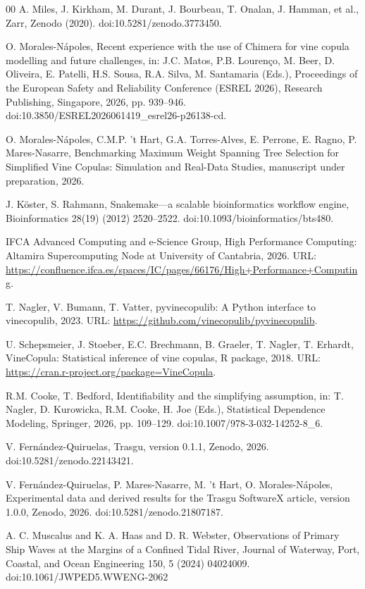 \documentclass[preprint,12pt, a4paper]{elsarticle}
\begin{document}
\begin{thebibliography}{00}
A. Miles, J. Kirkham, M. Durant, J. Bourbeau, T. Onalan, J. Hamman, et al.,
Zarr, Zenodo (2020). doi:10.5281/zenodo.3773450.

O. Morales-N{\'a}poles, Recent experience with the use of Chimera for vine
copula modelling and future challenges, in: J.C. Matos, P.B. Louren{\c{c}}o,
M. Beer, D. Oliveira, E. Patelli, H.S. Sousa, R.A. Silva, M. Santamaria
(Eds.), Proceedings of the European Safety and Reliability Conference
(ESREL 2026), Research Publishing, Singapore, 2026, pp. 939--946.
doi:10.3850/ESREL2026061419\_esrel26-p26138-cd.

O. Morales-N{\'a}poles, C.M.P. {'t} Hart, G.A. Torres-Alves, E. Perrone,
E. Ragno, P. Mares-Nasarre, Benchmarking Maximum Weight Spanning Tree Selection for Simplified Vine Copulas: Simulation and Real-Data Studies, manuscript under preparation, 2026.

J. K{\"o}ster, S. Rahmann, Snakemake---a scalable bioinformatics workflow
engine, Bioinformatics 28(19) (2012) 2520--2522.
doi:10.1093/bioinformatics/bts480.

IFCA Advanced Computing and e-Science Group, High Performance Computing:
Altamira Supercomputing Node at University of Cantabria, 2026.
URL: \url{https://confluence.ifca.es/spaces/IC/pages/66176/High+Performance+Computing}.

T. Nagler, V. Bumann, T. Vatter, pyvinecopulib: A Python interface to
vinecopulib, 2023. URL: \url{https://github.com/vinecopulib/pyvinecopulib}.

U. Schepsmeier, J. Stoeber, E.C. Brechmann, B. Graeler, T. Nagler,
T. Erhardt, VineCopula: Statistical inference of vine copulas, R package,
2018. URL: \url{https://cran.r-project.org/package=VineCopula}.

R.M. Cooke, T. Bedford, Identifiability and the simplifying assumption,
in: T. Nagler, D. Kurowicka, R.M. Cooke, H. Joe (Eds.),
Statistical Dependence Modeling, Springer, 2026, pp. 109--129.
doi:10.1007/978-3-032-14252-8\_6.

V. Fern\'andez-Quiruelas, Trasgu, version 0.1.1, Zenodo, 2026.
doi:10.5281/zenodo.22143421.

V. Fern\'andez-Quiruelas, P. Mares-Nasarre, M. {'t} Hart,
O. Morales-N\'apoles, Experimental data and derived results for the Trasgu
SoftwareX article, version 1.0.0, Zenodo, 2026.
doi:10.5281/zenodo.21807187.

A. C. Muscalus  and K. A. Haas  and D. R. Webster, Observations of Primary Ship Waves at the Margins of a Confined Tidal River, Journal of Waterway, Port, Coastal, and Ocean Engineering 150, 5 (2024) 04024009. doi:10.1061/JWPED5.WWENG-2062



\end{thebibliography}
\end{document}
